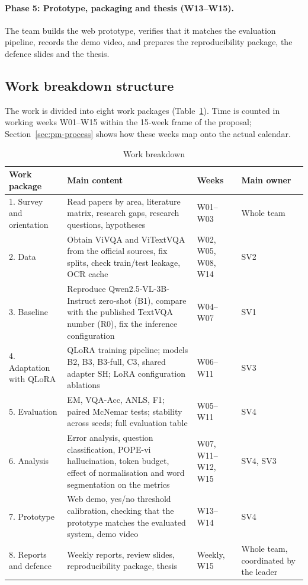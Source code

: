 \paragraph{Phase 5: Prototype, packaging and thesis (W13--W15).} The team builds the web
prototype, verifies that it matches the evaluation pipeline, records the demo video,
and prepares the reproducibility package, the defence slides and the thesis.

\subsection{Work breakdown structure}
\label{sec:pm-wbs}

The work is divided into eight work packages (Table~\ref{tab:pm-wbs}). Time is counted in
working weeks W01--W15 within the 15-week frame of the proposal;
Section~\ref{sec:pm-process} shows how these weeks map onto the actual calendar.

\begin{table}[htbp]
\caption{Work breakdown}
\label{tab:pm-wbs}
\centering
\small
\begin{tabular}{p{}p{}p{}p{}}
\toprule
\textbf{Work package} & \textbf{Main content} & \textbf{Weeks} & \textbf{Main owner} \\
\midrule
1. Survey and orientation & Read papers by area, literature matrix, research gaps, research questions, hypotheses & W01--W03 & Whole team \\
2. Data & Obtain ViVQA and ViTextVQA from the official sources, fix splits, check train/test leakage, OCR cache & W02, W05, W08, W14 & SV2 \\
3. Baseline & Reproduce Qwen2.5-VL-3B-Instruct zero-shot (B1), compare with the published TextVQA number (R0), fix the inference configuration & W04--W07 & SV1 \\
4. Adaptation with QLoRA & QLoRA training pipeline; models B2, B3, B3-full, C3, shared adapter SH; LoRA configuration ablations & W06--W11 & SV3 \\
5. Evaluation & EM, VQA-Acc, ANLS, F1; paired McNemar tests; stability across seeds; full evaluation table & W05--W11 & SV4 \\
6. Analysis & Error analysis, question classification, POPE-vi hallucination, token budget, effect of normalisation and word segmentation on the metrics & W07, W11--W12, W15 & SV4, SV3 \\
7. Prototype & Web demo, yes/no threshold calibration, checking that the prototype matches the evaluated system, demo video & W13--W14 & SV4 \\
8. Reports and defence & Weekly reports, review slides, reproducibility package, thesis & Weekly, W15 & Whole team, coordinated by the leader \\
\bottomrule
\end{tabular}
\end{table}

